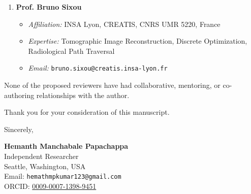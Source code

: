 \documentclass[11pt]{article}
\begin{document}
\begin{enumerate}
\begin{itemize}
        \item \textit{Email:} \texttt{skala@kiv.zcu.cz}
    \end{itemize}
    \item \textbf{Prof. Bruno Sixou}
    \begin{itemize}
        \item \textit{Affiliation:} INSA Lyon, CREATIS, CNRS UMR 5220, France
        \item \textit{Expertise:} Tomographic Image Reconstruction, Discrete Optimization, Radiological Path Traversal
        \item \textit{Email:} \texttt{bruno.sixou@creatis.insa-lyon.fr}
    \end{itemize}
\end{enumerate}

\noindent None of the proposed reviewers have had collaborative, mentoring, or co-authoring relationships with the author.

\vspace{0.4cm}
\noindent Thank you for your consideration of this manuscript.

\vspace{0.6cm}
\noindent Sincerely,

\vspace{0.3cm}
\noindent \textbf{Hemanth Manchabale Papachappa}\\
Independent Researcher\\
Seattle, Washington, USA\\
Email: \texttt{hemathmpkumar123@gmail.com}\\
ORCID: \href{https://orcid.org/0009-0007-1398-9451}{0009-0007-1398-9451}
\end{document}
